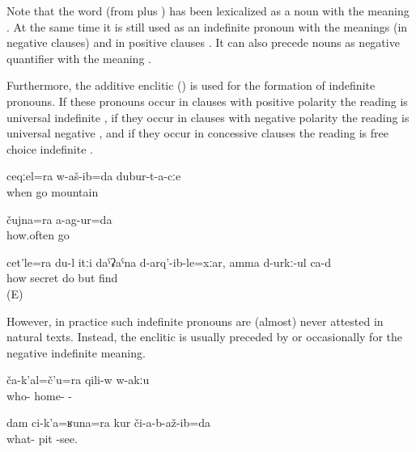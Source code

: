 Note that the word  (from   plus ) has been lexicalized as a noun with the meaning . At the same time it is still used as an indefinite pronoun with the meanings  (in negative clauses) and  in positive clauses . It can also precede nouns as negative quantifier with the meaning .

Furthermore, the additive enclitic  () is used for the formation of indefinite pronouns. If these pronouns occur in clauses with positive polarity the reading is universal indefinite , if they occur in clauses with negative polarity the reading is universal negative , and if they occur in concessive clauses the reading is free choice indefinite .
%
\begin{exe}
	\ex	\label{ex:I always went through the mountains}
	\gll	ceqːel=ra	w-aš-ib=da	dubur-t-a-cːe\\
		when	go	mountain\\
	\glt	{}

	\ex	\label{ex:I did not go even once.1}
	\gll	čujna=ra	a-ag-ur=da\\
		how.often	go\\
	\glt	{}

	\ex	\label{ex:However I hide them, (they always) find them}
	\gll	cet'le=ra	du-l	itːi	daˁʡaˁna	d-arq'-ib-le=xːar, amma d-urkː-ul ca-d\\
		how			secret	do	but	find \\
	\glt	{} (E)
\end{exe}

However, in practice such indefinite pronouns are (almost) never attested in natural texts. Instead, the enclitic  is usually preceded by   or occasionally   for the negative indefinite meaning.
%
\begin{exe}
	\ex	\label{ex:Nobody is at home}
	\gll	ča-k'al=č'u=ra	qili-w	w-akːu\\
		who-	home-\tsc{m}	-\\
	\glt	{}

	\ex	\label{ex:I do not see any pit}
	\gll	dam	ci-k'a=ʁuna=ra	kur	či-a-b-až-ib=da\\
			what-	pit	-see.\\
	\glt	{}
\end{exe}

